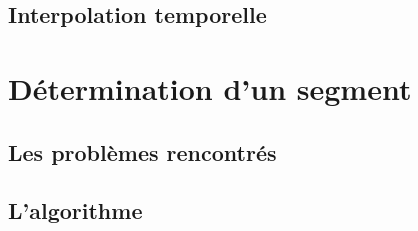 \subsection{Interpolation temporelle}

\section{Détermination d'un segment}
\subsection{Les problèmes rencontrés}
\subsection{L'algorithme}